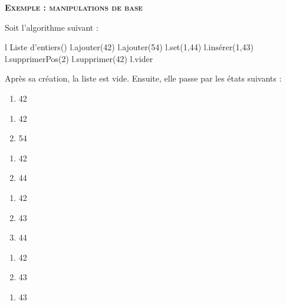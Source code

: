 		{\sffamily\bfseries\scshape
		Exemple : manipulations de base}
		
		Soit l'algorithme suivant :
		
		\begin{LDA}
				\Let l \Gets {} Liste d'entiers()
				\Stmt l.ajouter(42)
				\Stmt l.ajouter(54)
				\Stmt l.set(1,44)
				\Stmt l.insérer(1,43)
				\Stmt l.supprimerPos(2)
				\Stmt l.supprimer(42)
				\Stmt l.vider
			\EndAlgo
		\end{LDA}
		
		Après sa création, la liste est vide.
		Ensuite, elle passe par les états suivants :
		
		\begin{minipage}[t]{2cm}
		\begin{enumerate}[start=0]
		\item 42
		\end{enumerate}
		\end{minipage}
		\begin{minipage}[t]{2cm}
		\begin{enumerate}[start=0]
		\item 42
		\item 54
		\end{enumerate}
		\end{minipage}
		\begin{minipage}[t]{2cm}
		\begin{enumerate}[start=0]
		\item 42
		\item 44
		\end{enumerate}
		\end{minipage}
		\begin{minipage}[t]{2cm}
		\begin{enumerate}[start=0]
		\item 42
		\item 43
		\item 44
		\end{enumerate}
		\end{minipage}
		\begin{minipage}[t]{2cm}
		\begin{enumerate}[start=0]
		\item 42
		\item 43
		\end{enumerate}
		\end{minipage}
		\begin{minipage}[t]{2cm}
		\begin{enumerate}[start=0]
		\item 43
		\end{enumerate}
		\end{minipage}
		

